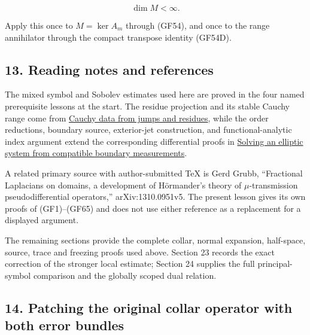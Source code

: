 \documentclass[
  11pt,
]{article}
\makeatletter
\let\ReaderOriginalAnchorStart\hyper@anchorstart
\let\ReaderOriginalAnchorEnd\hyper@anchorend
\let\ReaderPendingAliases\@empty
\def\ReaderArmAliases#1{\gdef\ReaderPendingAliases{#1}}
\def\hyper@anchorstart#1{\ReaderIfNativeAnchorTF{#1}{\ReaderPendingAliases\global\let\ReaderPendingAliases\@empty}{}\ReaderOriginalAnchorStart{#1}}
\makeatother
\begin{document}
\[
 \dim M<\infty.
 \tag{GF65}
\]

Apply this once to \(M=\ker A_m\) through (GF54), and once to the range
annihilator through the compact transpose identity (GF54D).

\ReaderArmAliases{\ReaderOriginalAnchorStart{AN03-GCF-013}\ReaderOriginalAnchorEnd\begingroup\expandafter\def\csname @currentHref\endcsname{AN03-GCF-013}\label{AN03-GCF-013}\endgroup\ReaderOriginalAnchorStart{13-reading-notes-and-references}\ReaderOriginalAnchorEnd\begingroup\expandafter\def\csname @currentHref\endcsname{13-reading-notes-and-references}\label{13-reading-notes-and-references}\endgroup\ReaderOriginalAnchorStart{reading-notes-and-references}\ReaderOriginalAnchorEnd}
\subsection{13. Reading notes and
references}\label{reading-notes-and-references}

The mixed symbol and Sobolev estimates used here are proved in the four
named prerequisite lessons at the start. The residue projection and its
stable Cauchy range come from \href{calderon-cauchy-data.pdf}{Cauchy data
from jumps and residues}, while the order reductions, boundary source,
exterior-jet construction, and functional-analytic index argument extend
the corresponding differential proofs in
\href{general-boundary-fredholm.pdf}{Solving an elliptic system from
compatible boundary measurements}.

A related primary source with author-submitted TeX is Gerd Grubb,
``Fractional Laplacians on domains, a development of Hörmander's theory
of \ensuremath{\mu}-transmission pseudodifferential operators,'' arXiv:1310.0951v5. The
present lesson gives its own proofs of (GF1)--(GF65) and does not use
either reference as a replacement for a displayed argument.

The remaining sections provide the complete collar, normal expansion,
half-space, source, trace and freezing proofs used above. Section 23
records the exact correction of the stronger local estimate; Section 24
supplies the full principal-symbol comparison and the globally scoped
dual relation.

\ReaderArmAliases{\ReaderOriginalAnchorStart{AN03-GCF-FOUNDATION-014}\ReaderOriginalAnchorEnd\begingroup\expandafter\def\csname @currentHref\endcsname{AN03-GCF-FOUNDATION-014}\label{AN03-GCF-FOUNDATION-014}\endgroup\ReaderOriginalAnchorStart{boundary-foundation-14}\ReaderOriginalAnchorEnd}
\subsection{14. Patching the original collar operator with both error
bundles}\label{boundary-foundation-14}
\end{document}
